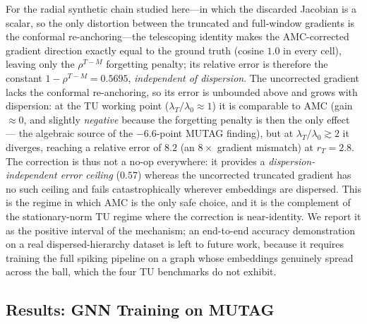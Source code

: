 \documentclass[a4paper,fleqn]{cas-dc}
\begin{document}
For the radial synthetic chain studied here---in which the discarded Jacobian is a scalar, so the only distortion between the truncated and full-window gradients is the conformal re-anchoring---the telescoping identity makes the AMC-corrected gradient direction exactly
equal to the ground truth (cosine $1.0$ in every cell), leaving only the
$\rho^{T-M}$ forgetting penalty; its relative error is therefore the constant
$1-\rho^{T-M}=0.5695$, \emph{independent of dispersion}. The uncorrected
gradient lacks the conformal re-anchoring, so its error is unbounded above and
grows with dispersion: at the TU working point ($\lambda_T/\lambda_0\approx1$)
it is comparable to AMC (gain $\approx0$, and slightly \emph{negative} because
the forgetting penalty is then the only effect --- the algebraic source of the
$-6.6$-point MUTAG finding), but at $\lambda_T/\lambda_0\gtrsim2$ it diverges,
reaching a relative error of $8.2$ (an $8\times$ gradient mismatch) at
$r_T{=}2.8$. The correction is thus not a no-op everywhere: it provides a
\emph{dispersion-independent error ceiling} ($0.57$) whereas the uncorrected
truncated gradient has no such ceiling and fails catastrophically wherever
embeddings are dispersed. This is the regime in which AMC is the only safe
choice, and it is the complement of the stationary-norm TU regime where the
correction is near-identity. We report it as the positive interval of the
mechanism; an end-to-end accuracy demonstration on a real dispersed-hierarchy
dataset is left to future work, because it requires training the full spiking
pipeline on a graph whose embeddings genuinely spread across the ball, which the
four TU benchmarks do not exhibit.

\subsection{Results: GNN Training on MUTAG}
\end{document}
